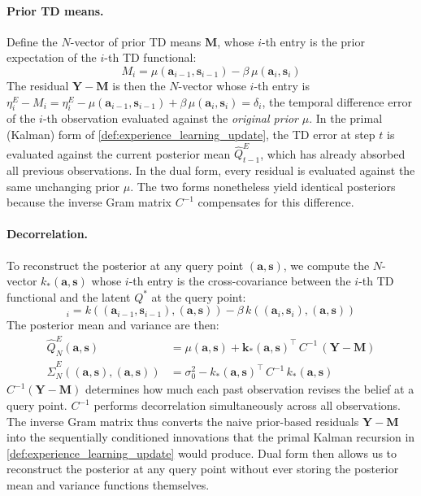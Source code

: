 \paragraph{Prior TD means.}
Define the $N$-vector of prior TD means $\mathbf{M}$, whose $i$-th entry
is the prior expectation of the $i$-th TD functional:
\begin{equation}
    M_i = \mu(\mathbf{a}_{i-1}, \mathbf{s}_{i-1})
    - \beta\, \mu(\mathbf{a}_i, \mathbf{s}_i)
\end{equation}
The residual $\mathbf{Y} - \mathbf{M}$ is then the $N$-vector whose $i$-th entry is
$\eta^E_i - M_i = \eta^E_i - \mu(\mathbf{a}_{i-1}, \mathbf{s}_{i-1})
+ \beta\, \mu(\mathbf{a}_i, \mathbf{s}_i) = \delta_i$, the temporal
difference error of the $i$-th observation evaluated against the
\emph{original prior} $\mu$. In the primal (Kalman) form of \ref{def:experience_learning_update}, the
TD error at step $t$ is evaluated against the current posterior
mean $\hat{Q}^E_{t-1}$, which has already absorbed all previous
observations. In the dual form, every residual is evaluated against
the same unchanging prior $\mu$. The two forms nonetheless yield
identical posteriors because the inverse Gram matrix $C^{-1}$
compensates for this difference.

\paragraph{Decorrelation.}
To reconstruct the posterior at any query point $(\mathbf{a}, \mathbf{s})$,
we compute the $N$-vector $k_*(\mathbf{a}, \mathbf{s})$ whose
$i$-th entry is the cross-covariance between the $i$-th TD functional and
the latent $Q^*$ at the query point:
\begin{equation}
    [k_*(\mathbf{a}, \mathbf{s})]_i
    = k((\mathbf{a}_{i-1}, \mathbf{s}_{i-1}), (\mathbf{a}, \mathbf{s}))
    - \beta\, k((\mathbf{a}_i, \mathbf{s}_i), (\mathbf{a}, \mathbf{s}))
\end{equation}
The posterior mean and variance are then:
\begin{align}
    \hat{Q}^E_N(\mathbf{a}, \mathbf{s})
    &= \mu(\mathbf{a}, \mathbf{s})
    + \mathbf{k}_*(\mathbf{a}, \mathbf{s})^\top \, C^{-1} \,
      (\mathbf{Y} - \mathbf{M})
    \label{eq:dual_mean} \\
    \hat{\Sigma}^E_N((\mathbf{a}, \mathbf{s}), (\mathbf{a}, \mathbf{s}))
    &= \sigma^2_0
    - k_*(\mathbf{a}, \mathbf{s})^\top \, C^{-1} \,
      k_*(\mathbf{a}, \mathbf{s})
\end{align}
$C^{-1}(\mathbf{Y} - \mathbf{M})$ determines how much each past observation
revises the belief at a query point. $C^{-1}$ performs decorrelation
simultaneously across all observations. The inverse Gram matrix thus converts the
naive prior-based residuals $\mathbf{Y} - \mathbf{M}$ into the
sequentially conditioned innovations that the primal Kalman recursion
in \ref{def:experience_learning_update} would produce.
Dual form then allows us to reconstruct the posterior at any query point without ever
storing the posterior mean and variance functions themselves.

